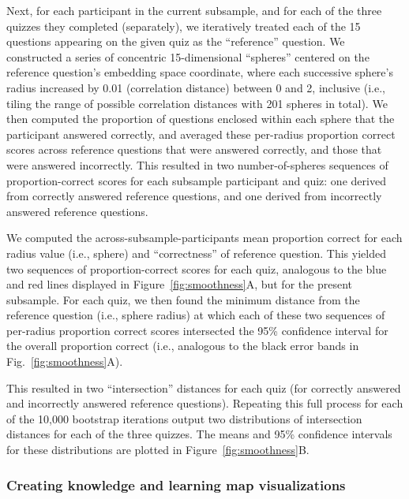 \documentclass[10pt]{article}
\begin{document}
Next, for each participant in the current subsample, and for each of the three
quizzes they completed (separately), we iteratively treated each of the 15
questions appearing on the given quiz as the ``reference'' question. We
constructed a series of concentric 15-dimensional ``spheres'' centered on the
reference question's embedding space coordinate, where each successive sphere's
radius increased by 0.01 (correlation distance) between 0 and 2, inclusive
(i.e., tiling the range of possible correlation distances with 201 spheres in
total). We then computed the proportion of questions enclosed within each
sphere that the participant answered correctly, and averaged these per-radius
proportion correct scores across reference questions that were answered
correctly, and those that were answered incorrectly. This resulted in two
number-of-spheres sequences of proportion-correct scores for each subsample
participant and quiz: one derived from correctly answered reference questions,
and one derived from incorrectly answered reference questions.

We computed the across-subsample-participants mean proportion correct for each
radius value (i.e., sphere) and ``correctness'' of reference question. This
yielded two sequences of proportion-correct scores for each quiz, analogous to
the blue and red lines displayed in Figure~\ref{fig:smoothness}A, but for the
present subsample. For each quiz, we then found the minimum distance from the
reference question (i.e., sphere radius) at which each of these two sequences
of per-radius proportion correct scores intersected the 95\% confidence
interval for the overall proportion correct (i.e., analogous to the black error
bands in Fig.~\ref{fig:smoothness}A).

This resulted in two ``intersection'' distances for each quiz (for correctly
answered and incorrectly answered reference questions). Repeating this full
process for each of the 10,000 bootstrap iterations output two distributions of
intersection distances for each of the three quizzes. The means and 95\%
confidence intervals for these distributions are plotted in
Figure~\ref{fig:smoothness}B.

\subsubsection*{Creating knowledge and learning map visualizations}\label{subsec:knowledge-maps}
\end{document}
